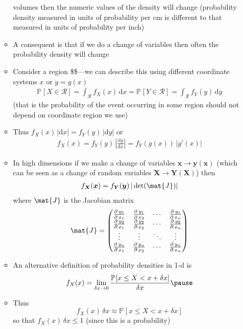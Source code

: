 \documentclass[11pt]{article}
\newcommand{\Prob}[2][]{\mathbb{P}_{#1\!}\left[ #2 \right]}
\newcommand{\dd}{\mathrm{d}}
\newcommand{\pd}[3][\,]{\frac{\partial^{#1}{#2}}{\partial\,{#3}}}
\begin{document}
\begin{itemize}
\begin{itemize}
volumes then the numeric values of the density will change
(probability density measured in units of probability
per cm is different to that measured in units of probability
per inch)
\item A consequent is that if we do a change of variables then
often the probability density will change
\item Consider a region \$\$---we can describe this using
different coordinate systems \(x\) or \(y= g(x)\)
\begin{align*}
\Prob{X\in\mathcal{R}}
= \int_{\mathcal{R}} f_{X}(x) \, \dd x
=  \Prob{Y\in\mathcal{R}}
= \int_{\mathcal{R}} f_{Y}(y) \, \dd y
\end{align*}
(that is the probability of the event occurring in some region
should not depend on coordinate region we use)
\item Thus \(f_{X}(x)\, |\dd x| = f_{Y}(y) \, |\dd y|\) or
\begin{align*}
 f_{X}(x)  = f_{Y}(y) \, \left| \frac{\dd y}{\dd x}
 \right| = f_{Y}(g(x)) \, | g'(x) |
\end{align*}
\item In high dimensions if we make a change of variables
\(\bm{x} \rightarrow \bm{y}(\bm{x})\) (which can be seen as a change
of random variables \(\bm{X}\rightarrow\bm{Y}(\bm{X})\)) then
\begin{align*}
f_{\bm{X}}(\bm{x}) = f_{\bm{Y}}(\bm{y}) \, |\det(\mat{J})| 
\end{align*}
where \(\mat{J}\) is the Jacobian matrix
\begin{align*}
  \mat{J} =
  \begin{pmatrix}
   \pd{y_1}{x_1} & \pd{y_1}{x_2} & \cdots & \pd{y_1}{x_n} \\
   \pd{y_2}{x_1} & \pd{y_2}{x_2} & \cdots & \pd{y_2}{x_n} \\
   \vdots & \vdots & \ddots & \vdots \\
   \pd{y_n}{x_1} & \pd{y_n}{x_2} & \cdots & \pd{y_n}{x_n}
  \end{pmatrix}
\end{align*}
\item An alternative definition of probability densities in 1-d is
\begin{align*}
f_X(x) = \lim_{\delta x\rightarrow 0}
\frac{\Prob{x \leq X < x + \delta x}}{\delta x}\pause
\end{align*}
\item Thus
$$f_X(x)\,\delta x \approx \Prob{x \leq X < x + \delta x}$$
so that \(f_X(x)\,\delta x\leq 1\) (since this is a probability)

\end{itemize}
\end{itemize}
\end{document}
